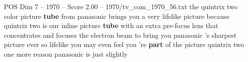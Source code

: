 \begin{textsample}{POS Dim 7 – 1970 – Score 2.00 – 1970/tv\_com\_1970\_56.txt}  \label{ex:f7_pos_034}
the quintrix two color picture \textbf{tube} from panasonic brings you a very lifelike picture because quintrix two is our inline picture \textbf{tube} with an extra pre-focus lens that concentrates and focuses the electron beam to bring you panasonic 's sharpest picture ever so lifelike you may even feel you 're \textbf{part} of the picture quintrix two one more reason panasonic is just slightly

\end{textsample}
